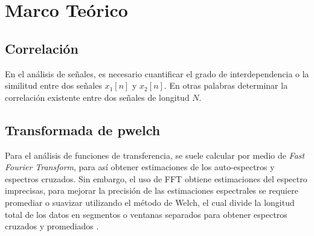 \section{Marco Teórico}

\subsection{Correlación}
\par En el análisis de señales, es necesario cuantificar el grado de interdependencia o la similitud entre dos señales $x_1[n]$ y $x_2[n]$. En otras palabras determinar la correlación existente entre dos señales de longitud $N$.

\subsection{Transformada de pwelch}
\par Para el análisis de funciones de transferencia, se suele calcular por medio de \textit{Fast Fourier Transform}, para así obtener estimaciones de los auto-espectros y espectros cruzados. Sin embargo, el uso de FFT obtiene estimaciones del espectro imprecisas, para mejorar la precisión de las estimaciones espectrales se requiere promediar o suavizar utilizando el método de Welch, el cual divide la longitud total de los datos en segmentos o ventanas separados para obtener espectros cruzados y promediados \parencite{claassen2016transfer}.




